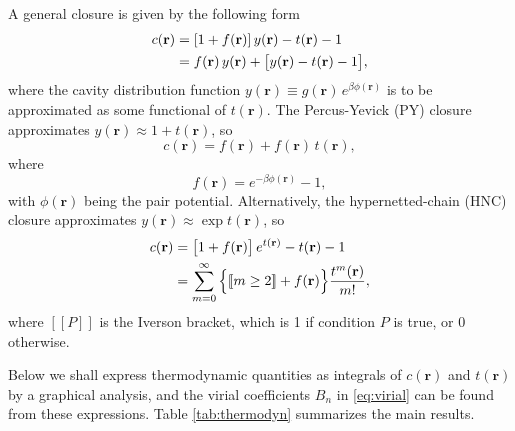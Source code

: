 \documentclass[preprint]{revtex4-1}
\newcommand{\vct}[1]{\mathbf{#1}}
\providecommand{\vr}{} %
\renewcommand{\vr}{\vct{r}}
\newcommand{\llbra}{[\![}
\newcommand{\llket}{]\!]}
\begin{document}
A general closure is given by the following form
%
\begin{align}
  c(\vr)
&= [1 + f(\vr)] \, y(\vr) - t(\vr) - 1
  \notag \\
&= f(\vr) \, y(\vr) + \big[ y(\vr) - t(\vr) - 1 \big],
  \label{eq:closure}
\end{align}
%
where the cavity distribution function $y(\vr) \equiv g(\vr) \, e^{ \beta \phi(\vr) }$
  is to be approximated as some functional of $t(\vr)$.
%
The Percus-Yevick (PY) closure\cite{percusyevick}
  approximates $y(\vr) \approx 1 + t(\vr)$, so
%
\begin{equation}
  c(\vr) = f(\vr) + f(\vr) \, t(\vr),
  \label{eq:py}
\end{equation}
where
\begin{equation}
  f(\vr) = e^{-\beta \phi(\vr)} - 1,
  \label{eq:fbond}
\end{equation}
with $\phi(\vr)$ being the pair potential.
%
Alternatively, the hypernetted-chain (HNC) closure\cite{
morita1958, *morita1959, *morita1960,
vanleeuwen1959, meeron1960, verlet1960, green1960, rushbrooke1960}
  approximates $y(\vr) \approx \exp { t(\vr) }$, so
%
\begin{align}
  c(\vr) &= \big[ 1 + f(\vr) \big] \, e^{t(\vr)} - t(\vr) - 1 \notag \\
         &= \sum_{m=0}^\infty
                \Big\{ \llbra m \ge 2 \llket + f(\vr) \Big\}
                \frac{ t^m(\vr) }{ m! },
  \label{eq:hnc}
\end{align}
%
where $\llbra P \llket$ is the Iverson bracket,
  which is 1 if condition $P$ is true, or 0 otherwise.

Below we shall express thermodynamic quantities
  as integrals of $c(\vr)$ and $t(\vr)$
  by a graphical analysis,
%
and the virial coefficients $B_n$ in \eqref{eq:virial}
  can be found from these expressions.
%
Table \ref{tab:thermodyn}
  summarizes the main results.

\ifdim \columnwidth < 4in
  \newcommand{\tabscale}{1.0}
\else
  \newcommand{\tabscale}{0.85}
\fi
\end{document}
